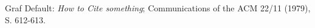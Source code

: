         Graf Default: {\sl How to Cite something}; 
        Communications of the ACM 22/11 (1979), S. 612-613.

